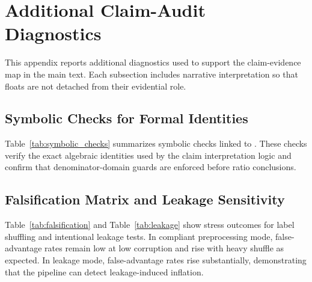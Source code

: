 \documentclass{article} %
\begin{document}
\clearpage{}\label{sec:end_of_main}






\appendix
\clearpage{}\label{sec:appendix_start}

\section{Additional Claim-Audit Diagnostics}
\label{app:diagnostics}
This appendix reports additional diagnostics used to support the claim-evidence map in the main text. Each subsection includes narrative interpretation so that floats are not detached from their evidential role.

\subsection{Symbolic Checks for Formal Identities}
Table~\ref{tab:symbolic_checks} summarizes symbolic checks linked to . These checks verify the exact algebraic identities used by the claim interpretation logic and confirm that denominator-domain guards are enforced before ratio conclusions.

\begin{table}[h]
\centering
\small
\renewcommand{\arraystretch}{1.1}
\setlength{\tabcolsep}{4pt}
\caption{Symbolic validation outcomes for the formal identities used in the main text. Each row corresponds to a proof-linked identity or guard condition. The table supports reproducibility of interpretation logic rather than reporting model performance.}
\label{tab:symbolic_checks}

\end{table}

\subsection{Falsification Matrix and Leakage Sensitivity}
Table~\ref{tab:falsification} and Table~\ref{tab:leakage} show stress outcomes for label shuffling and intentional leakage tests. In compliant preprocessing mode, false-advantage rates remain low at low corruption and rise with heavy shuffle as expected. In leakage mode, false-advantage rates rise substantially, demonstrating that the pipeline can detect leakage-induced inflation.

\begin{table}[h]
\centering
\small
\renewcommand{\arraystretch}{1.1}
\setlength{\tabcolsep}{4pt}
\caption{Falsification outcomes under label-shuffle and leakage modes. The parity-violation and trigger columns indicate when stress probes invalidate a clean-claim interpretation. The table demonstrates that falsification pathways are active and visible in reporting.}
\label{tab:falsification}

\end{table}
\end{document}
